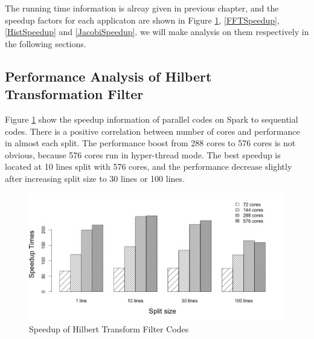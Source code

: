 The running time information is alreay given in previous chapter, and the speedup factors for each applicaton are shown in Figure \ref{HtfSpeedup}, \ref{FFTSpeedup}, \ref{HistSpeedup} and \ref{JacobiSpeedup}. we will make analysis on them respectively in the following sections. 

\subsection{Performance Analysis of Hilbert Transformation Filter}
Figure \ref{HtfSpeedup} show the speedup information of parallel codes on Spark to sequential codes. There is a positive correlation between number of cores and performance in almost each split. The performance boost from 288 cores to 576 cores is not obvious, because 576 cores run in hyper-thread mode. The best  speedup is located at 10 lines split with 576 cores, and the performance decrease slightly after increasing split size to 30 lines or 100 lines.

\begin{figure}[h]
\includegraphics[scale=.50]{figures/HtfSpeedup.png}
\caption{Speedup of Hilbert Transform Filter Codes}
\label{HtfSpeedup}
\end{figure}


